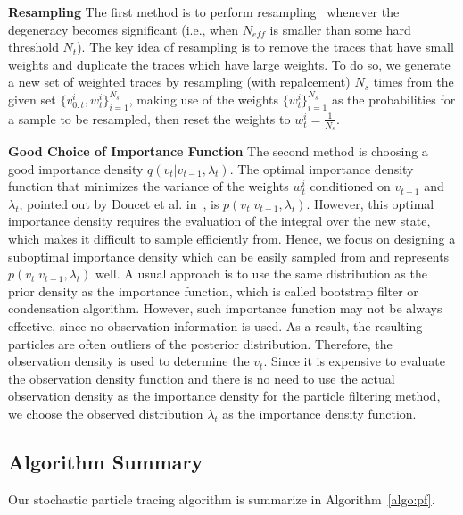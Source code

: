 \textbf{Resampling} The first method is to perform resampling~\cite{doucet2001sequential, gordon:107} whenever the degeneracy becomes significant (i.e., when $N_{eff}$ is smaller than some hard threshold $N_t$). The key idea of resampling is to remove the traces that have small weights and duplicate the traces which have large weights. To do so, we generate a new set of weighted traces by resampling (with repalcement) $N_s$ times from the given set $\{ v_{0:t}^i,w_t^i\} _{i = 1}^{{N_s}}$, making use of the weights $\{w_t^i\} _{i = 1}^{{N_s}}$ as the probabilities for a sample to be resampled, then reset the weights to $w_t^i = \frac{1}{{{N_s}}}$.

\textbf{Good Choice of Importance Function} The second method is choosing a good importance density $q({v_t}|{v_{t - 1}},{\lambda_t})$. The optimal importance density function that minimizes the variance of the weights $w_t^i$ conditioned on $v_{t-1}$ and $\lambda_t$, pointed out by Doucet et al. in~\cite{Doucet00onsequential}, is $p(v_t|v_{t-1}, \lambda_t)$. However, this optimal importance density requires the evaluation of the integral over the new state, which makes it difficult to sample efficiently from. Hence, we focus on designing a suboptimal importance density which can be easily sampled from and represents $p(v_t|v_{t-1}, \lambda_t)$ well. A usual approach is to use the same distribution as the prior density as the importance function, which is called bootstrap filter or condensation algorithm. However, such importance function may not be always effective, since no observation information is used. As a result, the resulting particles are often outliers of the posterior distribution. Therefore, the observation density is used to determine the $v_t$. Since it is expensive to evaluate the observation density function and there is no need to use the actual observation density as the importance density for the particle filtering method, we choose the observed distribution $\lambda_t$ as the importance density function.

\subsection{Algorithm Summary}

Our stochastic particle tracing algorithm is summarize in Algorithm~\ref{algo:pf}.

